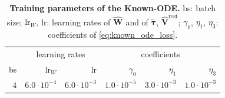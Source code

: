 \begin{table}[h!]
\centering
\caption{\textbf{Training parameters of the Known-ODE.} bs: batch size; $\text{lr}_W$, lr: learning rates of
$\hat{\mathbf{W}}$ and of $\tilde{\boldsymbol\tau}$, $\hat{\mathbf{V}}^{\mathrm{rest}}$;
$\gamma_0$, $\eta_1$, $\eta_3$: coefficients of \cref{eq:known_ode_loss}.}
\label{tab:known_ode_hp}
\small
\setlength{\tabcolsep}{6pt}
\begin{tabular}{rrrrrr}
\toprule
 & \multicolumn{2}{c}{learning rates} & \multicolumn{3}{c}{coefficients} \\
bs & $\text{lr}_W$ & lr & $\gamma_0$ & $\eta_1$ & $\eta_3$ \\
\midrule
{\color{revised}$4$} & {\color{revised}$6.0{\cdot}10^{-4}$} & {\color{revised}$6.0{\cdot}10^{-3}$}
  & $1.0{\cdot}10^{-5}$ & $3.0{\cdot}10^{-3}$ & $1.0{\cdot}10^{-3}$ \\
\bottomrule
\end{tabular}
\end{table}
